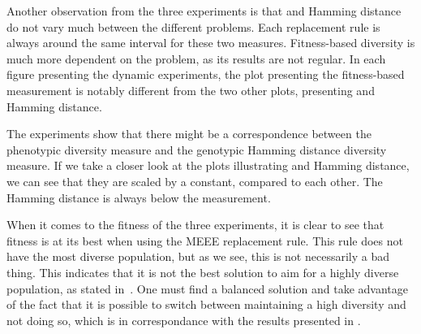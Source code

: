 Another observation from the three experiments is that \dia{} and Hamming distance do not vary much between the different problems. Each replacement rule is always around the same interval for these two measures. Fitness-based diversity is much more dependent on the problem, as its results are not regular. In each figure presenting the dynamic experiments, the plot presenting the fitness-based measurement is notably different from the two other plots, presenting \dia{} and Hamming distance.

The experiments show that there might be a correspondence between the phenotypic \dia{} diversity measure and the genotypic Hamming distance diversity measure. If we take a closer look at the plots illustrating \dia{} and Hamming distance, we can see that they are scaled by a constant, compared to each other. The Hamming distance is always below the \dia{} measurement.%

When it comes to the fitness of the three experiments, it is clear to see that fitness is at its best when using the MEEE replacement rule. This rule does not have the most diverse population, but as we see, this is not necessarily a bad thing. This indicates that it is not the best solution to aim for a highly diverse population, as stated in~\cite{Darwen00doesextra}. One must find a balanced solution and take advantage of the fact that it is possible to switch between maintaining a high diversity and not doing so, which is in correspondance with the results presented in \cite{Darwen00doesextra}.
